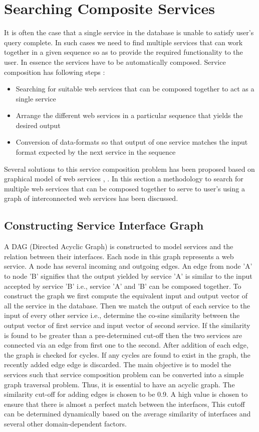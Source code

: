 \documentclass[12pt, oneside]{book}
\begin{document}
\section{Searching Composite Services}
It is often the case that a single service in the database is unable to satisfy user's query complete. In such cases we need to find multiple services that can work together in a given sequence so as to provide the required functionality to the user. In essence the services have to be automatically composed. Service composition has following steps :
\begin{itemize}
 \item Searching for suitable web services that can be composed together to act as a single service
 \item Arrange the different web services in a particular sequence that yields the desired output
 \item Conversion of data-formats so that output of one service matches the input format expected by the next service in the sequence
\end{itemize}
Several solutions to this service composition problem has been proposed based on graphical model of web services \cite{graph_search}, \cite{graph_composition}. In this section a methodology to search for multiple web services that can be composed together to serve to user's using a graph of interconnected web services has been discussed.

\subsection{Constructing Service Interface Graph}
A DAG (Directed Acyclic Graph) is constructed to model services and the relation between their interfaces. Each node in this graph represents a web service. A node has several incoming and outgoing edges. An edge from node 'A' to node 'B' signifies that the output yielded by service 'A' is similar to the input accepted by service 'B' i.e., service 'A' and 'B' can be composed together. To construct the graph we first compute the equivalent input and output vector of all the service in the database. Then we match the output of each service to the input of every other service i.e., determine the co-sine similarity between the output vector of first service and input vector of second service. If the similarity is found to be greater than a pre-determined cut-off then the two services are connected via an edge from first one to the second. After addition of each edge, the graph is checked for cycles. If any cycles are found to exist in the graph, the recently added edge edge is discarded. The main objective is to model the services such that service composition problem can be converted into a simple graph traversal problem. Thus, it is essential to have an acyclic graph. The similarity cut-off for adding edges is chosen to be 0.9. A high value is chosen to ensure that there is almost a perfect match between the interfaces, This cutoff can be determined dynamically based on the average similarity of interfaces and several other domain-dependent factors.
\end{document}
